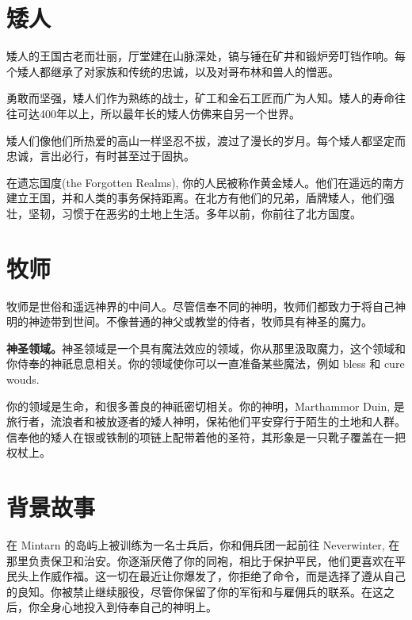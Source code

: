 \documentclass[letterpaper,twocolumn,openany,nodeprecatedcode]{dndbook}
\begin{document}



\mainmatter%

\section{矮人}

\footnotesize

矮人的王国古老而壮丽，厅堂建在山脉深处，镐与锤在矿井和锻炉旁叮铛作响。每个矮人都继承了对家族和传统的忠诚，以及对哥布林和兽人的憎恶。

勇敢而坚强，矮人们作为熟练的战士，矿工和金石工匠而广为人知。矮人的寿命往往可达400年以上，所以最年长的矮人仿佛来自另一个世界。

矮人们像他们所热爱的高山一样坚忍不拔，渡过了漫长的岁月。每个矮人都坚定而忠诚，言出必行，有时甚至过于固执。

在遗忘国度(the Forgotten Realms), 你的人民被称作黄金矮人。他们在遥远的南方建立王国，并和人类的事务保持距离。在北方有他们的兄弟，盾牌矮人，他们强壮，坚韧，习惯于在恶劣的土地上生活。多年以前，你前往了北方国度。

\section{牧师}

牧师是世俗和遥远神界的中间人。尽管信奉不同的神明，牧师们都致力于将自己神明的神迹带到世间。不像普通的神父或教堂的侍者，牧师具有神圣的魔力。

\textbf{神圣领域。}神圣领域是一个具有魔法效应的领域，你从那里汲取魔力，这个领域和你侍奉的神祇息息相关。你的领域使你可以一直准备某些魔法，例如 bless 和 cure wouds.

你的领域是生命，和很多善良的神祇密切相关。你的神明，Marthammor Duin, 是旅行者，流浪者和被放逐者的矮人神明，保祐他们平安穿行于陌生的土地和人群。信奉他的矮人在银或铁制的项链上配带着他的圣符，其形象是一只靴子覆盖在一把权杖上。

\section{背景故事}

在 Mintarn 的岛屿上被训练为一名士兵后，你和佣兵团一起前往 Neverwinter, 在那里负责保卫和治安。你逐渐厌倦了你的同袍，相比于保护平民，他们更喜欢在平民头上作威作福。这一切在最近让你爆发了，你拒绝了命令，而是选择了遵从自己的良知。你被禁止继续服役，尽管你保留了你的军衔和与雇佣兵的联系。在这之后，你全身心地投入到侍奉自己的神明上。
\end{document}
